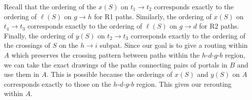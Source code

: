 \documentclass[11pt]{article}
\begin{document}
\begin{enumerate}[label=\roman*.]
    Recall that the ordering of the $x(S)$ on $t_1\to t_2$ corresponds exactly to the ordering of $\ell(S)$ on $g\to h$ for R1 paths. Similarly, the ordering of $x(S)$ on $t_4\to t_3$ corresponds exactly to the ordering of $\ell(S)$ on $g\to d$ for R2 paths. Finally, the ordering of $y(S)$ on $t_2\to t_3$ corresponds exactly to the ordering of the crossings of $S$ on the $h\to i$ subpat. Since our goal is to give a routing within $A$ which preserves the crossing pattern between paths within the $h$-$d$-$g$-$b$ region, we can take the exact drawings of the paths connecting pairs of portals in $B$ and use them in $A$. This is possible because the orderings of $x(S)$ and $y(S)$ on $A$ corresponds exactly to those on the $h$-$d$-$g$-$b$ region. This gives our rerouting within $A$.
\end{enumerate}
\end{document}
